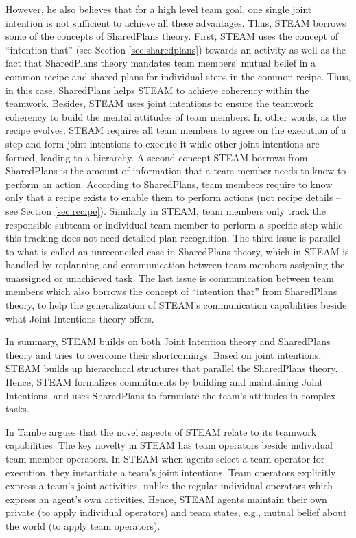 \documentclass[12pt]{report}
\begin{document}
However, he also believes that for a high level team goal, one single joint
intention is not sufficient to achieve all these advantages. Thus, STEAM borrows
some of the concepts of SharedPlans theory. First, STEAM uses the concept of
``intention that'' (see Section \ref{sec:sharedplans}) towards an activity as
well as the fact that SharedPlans theory mandates team members' mutual belief in
a common recipe and shared plans for individual steps in the common recipe.
Thus, in this case, SharedPlans helps STEAM to achieve coherency within the
teamwork. Besides, STEAM uses joint intentions to ensure the teamwork coherency
to build the mental attitudes of team members. In other words, as the recipe
evolves, STEAM requires all team members to agree on the execution of a step and
form joint intentions to execute it while other joint intentions are formed,
leading to a hierarchy. A second concept STEAM borrows from SharedPlans is the
amount of information that a team member needs to know to perform an action.
According to SharedPlans, team members require to know only that a recipe exists
to enable them to perform actions (not recipe details -- see Section
\ref{sec:recipe}). Similarly in STEAM, team members only track the responsible
subteam or individual team member to perform a specific step while this tracking
does not need detailed plan recognition. The third issue is parallel to what is
called an unreconciled case in SharedPlans theory, which in STEAM is handled by
replanning and communication between team members assigning the unassigned or
unachieved task. The last issue is communication between team members which also
borrows the concept of ``intention that'' from SharedPlans theory, to help the
generalization of STEAM's communication capabilities beside what Joint
Intentions theory offers.

In summary, STEAM builds on both Joint Intention theory and SharedPlans theory
and tries to overcome their shortcomings. Based on joint intentions, STEAM
builds up hierarchical structures that parallel the SharedPlans theory. Hence,
STEAM formalizes commitments by building and maintaining Joint Intentions, and
uses SharedPlans to formulate the team's attitudes in complex tasks.

In \cite{tambe:flexible-teamwork} Tambe argues that the novel aspects of STEAM
relate to its teamwork capabilities. The key novelty in STEAM has team operators
beside individual team member operators. In STEAM when agents select a team
operator for execution, they instantiate a team's joint intentions. Team
operators explicitly express a team's joint activities, unlike the regular
individual operators which express an agent's own activities. Hence, STEAM
agents maintain their own private (to apply individual operators) and team
states, e.g., mutual belief about the world (to apply team operators).
\end{document}
